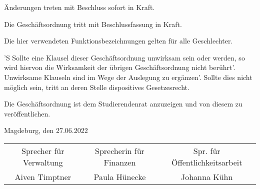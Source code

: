 \documentclass[%
	parskip=half,
]{scrartcl}
\begin{document}
\begin{contract}
Änderungen treten mit Beschluss sofort in Kraft.


Die Geschäftsordnung tritt mit Beschlussfassung in Kraft.

Die hier verwendeten Funktionsbezeichnungen gelten für alle Geschlechter.

'S Sollte eine Klausel dieser Geschäftsordnung unwirksam sein oder werden, so wird hiervon die Wirksamkeit der übrigen
Geschäftsordnung nicht berührt'. Unwirksame Klauseln sind im Wege der Auslegung zu ergänzen'. Sollte dies nicht möglich
sein, tritt an deren Stelle dispositives Gesetzesrecht.

Die Geschäftsordnung ist dem Studierendenrat anzuzeigen und von diesem zu veröffentlichen.

\end{contract}

\vspace{1cm}

Magdeburg, den 27.06.2022

\vspace{1cm}

\begin{table}[h]
	\centering
	\begin{tabular}{ccc}
		\cmidrule(lr){1-1} \cmidrule(lr){2-2} \cmidrule(lr){3-3}
		Sprecher für Verwaltung & Sprecherin für Finanzen & Spr. für Öffentlichkeitsarbeit \\
		Aiven Timptner & Paula Hünecke & Johanna Kühn
	\end{tabular}
\end{table}
\end{document}
